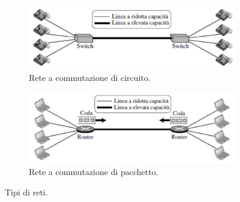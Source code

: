 \documentclass[11pt, italian, openany]{book}
\begin{document}
\begin{sloppypar}
\begin{figure}[h!]
	\begin{subfigure}[t]{0.49 \linewidth} \centering
		\includegraphics[scale=0.25]{images/commutazione-circuito.png}
		\caption{Rete a commutazione di circuito.}
	\end{subfigure}
	\begin{subfigure}[t]{0.49 \linewidth} \centering
		\includegraphics[scale=0.25]{images/commutazione-pacchetto.png}
		\caption{Rete a commutazione di pacchetto.}
	\end{subfigure}
	\caption{Tipi di reti.}
	\label{fig:tipi-reti}
\end{figure}


\end{sloppypar}
\end{document}
